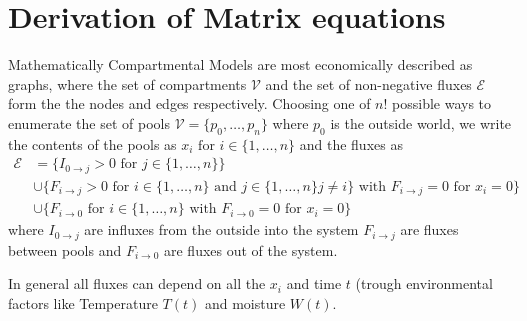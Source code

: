 \section{Derivation of Matrix equations}
\label{appendix:MatrixDerivation}
Mathematically Compartmental Models are most economically described as graphs, where the set of compartments $\mathcal{V}$ and the set of non-negative fluxes $\mathcal{E}$ form the the nodes and edges respectively. 
Choosing one of $n!$ possible ways to enumerate  the set of pools $\mathcal{V}=\{p_0,\dots,p_n\}$ where $p_0$ is the outside world, we write the contents of the pools as $x_i \text{ for } i \in \{1,\dots,n\} $ and the fluxes as
\begin{align*}
\mathcal{E} &=
\{
I_{0 \rightarrow j} > 0
\text{ for } j \in \{1,\dots ,n\}
\}  
\\
&
\cup
\{
F_{i \rightarrow j} > 0
\text{ for } i \in \{1,\dots ,n\} 
\text{ and } j \in \{1,\dots ,n\} j\ne i
\}
\text{ with }
F_{i \rightarrow j}=0 \text{ for }  x_{i} = 0 
\}
\\
&
\cup
\{
F_{i \rightarrow 0} 
\text{ for } i \in \{1,\dots ,n\} 
\text{ with }
F_{i \rightarrow 0}=0 \text{ for }  x_{i} = 0 
\}
\end{align*}
\label{massbalance} 
where 
$ 
I_{0 \rightarrow j} 
$
are influxes from the outside into the system 
$
F_{i \rightarrow j} 
$
are fluxes between pools 
and 
$
F_{i \rightarrow 0} 
$
are fluxes out of the system.

In general all fluxes can depend on all the $x_i$  and time $t$ (trough environmental factors like  Temperature $T(t)$ and moisture $W(t)$.


